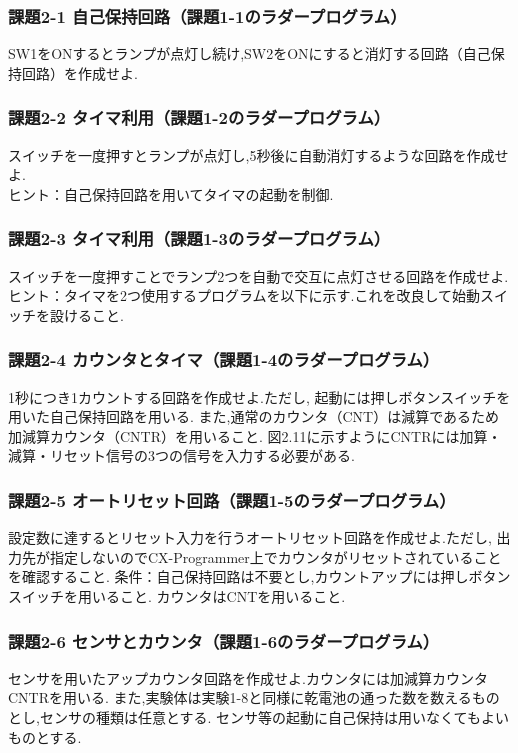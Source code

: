 \subsubsection*{課題2-1 自己保持回路（課題1-1のラダープログラム）}
SW1をONするとランプが点灯し続け,SW2をONにすると消灯する回路（自己保持回路）を作成せよ.

\subsubsection*{課題2-2 タイマ利用（課題1-2のラダープログラム）}
スイッチを一度押すとランプが点灯し,5秒後に自動消灯するような回路を作成せよ.\\
ヒント：自己保持回路を用いてタイマの起動を制御.

\subsubsection*{課題2-3 タイマ利用（課題1-3のラダープログラム）}
スイッチを一度押すことでランプ2つを自動で交互に点灯させる回路を作成せよ.
ヒント：タイマを2つ使用するプログラムを以下に示す.これを改良して始動スイッチを設けること.

\subsubsection*{課題2-4 カウンタとタイマ（課題1-4のラダープログラム）}
1秒につき1カウントする回路を作成せよ.ただし,
起動には押しボタンスイッチを用いた自己保持回路を用いる.
また,通常のカウンタ（CNT）は減算であるため加減算カウンタ（CNTR）を用いること.
図2.11に示すようにCNTRには加算・減算・リセット信号の3つの信号を入力する必要がある.

\subsubsection*{課題2-5 オートリセット回路（課題1-5のラダープログラム）}
設定数に達するとリセット入力を行うオートリセット回路を作成せよ.ただし,
出力先が指定しないのでCX-Programmer上でカウンタがリセットされていることを確認すること.
条件：自己保持回路は不要とし,カウントアップには押しボタンスイッチを用いること.
カウンタはCNTを用いること.

\subsubsection*{課題2-6 センサとカウンタ（課題1-6のラダープログラム）}
センサを用いたアップカウンタ回路を作成せよ.カウンタには加減算カウンタCNTRを用いる.
また,実験体は実験1-8と同様に乾電池の通った数を数えるものとし,センサの種類は任意とする.
センサ等の起動に自己保持は用いなくてもよいものとする.


